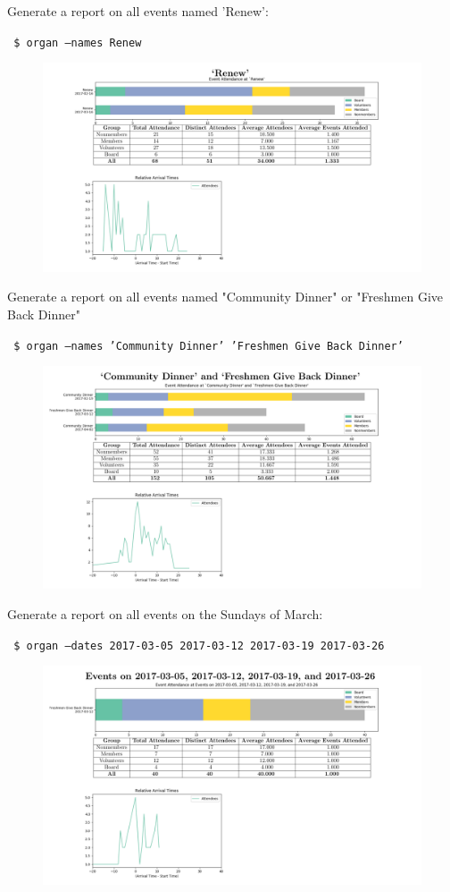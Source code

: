 \documentclass[12pt]{article}
\begin{document}
Generate a report on all events named 'Renew':

\texttt{ \$ organ --names Renew}
\begin{figure}[H]
    \centering
    \includegraphics[width=5.3in]{./media/name.pdf}
\end{figure}
\pagebreak

Generate a report on all events named "Community Dinner" or "Freshmen Give Back Dinner"

\texttt{ \$ organ --names 'Community Dinner' 'Freshmen Give Back Dinner'}
\begin{figure}[H]
    \centering
    \includegraphics[width=5.3in]{./media/names.pdf}
\end{figure}
\pagebreak

Generate a report on all events on the Sundays of March:

\texttt{ \$ organ --dates 2017-03-05 2017-03-12 2017-03-19 2017-03-26}
\begin{figure}[H]
    \centering
    \includegraphics[width=5.3in]{./media/dates.pdf}
\end{figure}
\pagebreak
\end{document}
